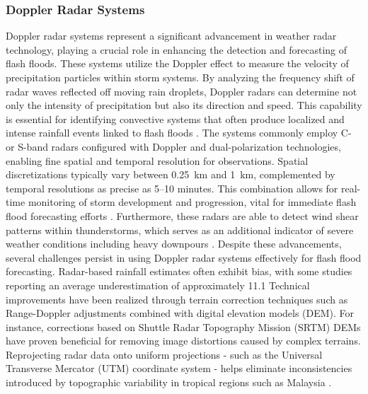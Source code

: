 \subsubsection{Doppler Radar Systems}
Doppler radar systems represent a significant advancement in weather radar technology, playing a crucial role in enhancing the detection and forecasting of flash floods. These systems utilize the Doppler effect to measure the velocity of precipitation particles within storm systems. By analyzing the frequency shift of radar waves reflected off moving rain droplets, Doppler radars can determine not only the intensity of precipitation but also its direction and speed. This capability is essential for identifying convective systems that often produce localized and intense rainfall events linked to flash floods \citep{Hermoso2021}\citep{Yatheendradas2008}.
The systems commonly employ C- or S-band radars configured with Doppler and dual-polarization technologies, enabling fine spatial and temporal resolution for observations. Spatial discretizations typically vary between \SI{0.25}{\km} and \SI{1}{\km}, complemented by temporal resolutions as precise as 5–10 minutes. This combination allows for real-time monitoring of storm development and progression, vital for immediate flash flood forecasting efforts \citep{Zanchetta2020}. Furthermore, these radars are able to detect wind shear patterns within thunderstorms, which serves as an additional indicator of severe weather conditions including heavy downpours \citep{Msigwa2024}.
Despite these advancements, several challenges persist in using Doppler radar systems effectively for flash flood forecasting. Radar-based rainfall estimates often exhibit bias, with some studies reporting an average underestimation of approximately 11.1%
Technical improvements have been realized through terrain correction techniques such as Range-Doppler adjustments combined with digital elevation models (DEM). For instance, corrections based on Shuttle Radar Topography Mission (SRTM) DEMs have proven beneficial for removing image distortions caused by complex terrains. Reprojecting radar data onto uniform projections - such as the Universal Transverse Mercator (UTM) coordinate system - helps eliminate inconsistencies introduced by topographic variability in tropical regions such as Malaysia \citep{Ngo2018}\citep{Maqtan2022a}\citep{Maqtan2022b}.
